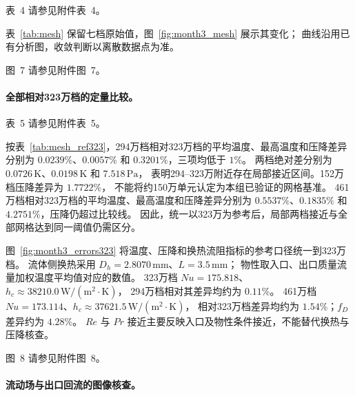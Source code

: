 \documentclass[stage2,fontset=fandol]{ydzjreport}
\makeatletter
\newcommand{\submissionnumber}[1]{\def\@currentlabel{#1}}
\makeatother
\begin{document}
\par\noindent \begingroup\submissionnumber{4}\label{tab:mesh}\endgroup 表~4 请参见附件表~4。\par


表~\ref{tab:mesh} 保留七档原始值，图~\ref{fig:month3_mesh} 展示其变化；
曲线沿用已有分析图，收敛判断以离散数据点为准。

\par\noindent \begingroup\submissionnumber{7}\label{fig:month3_mesh}\endgroup 图~7 请参见附件图~7。\par


\paragraph{全部相对323万档的定量比较。}


\par\noindent \begingroup\submissionnumber{5}\label{tab:mesh_ref323}\endgroup 表~5 请参见附件表~5。\par


按表~\ref{tab:mesh_ref323}，294万档相对323万档的平均温度、最高温度和压降差异分别为
$0.0239\%$、$0.0057\%$ 和 $0.3201\%$，三项均低于 $1\%$。
两档绝对差分别为 $0.0726\,\mathrm{K}$、$0.0198\,\mathrm{K}$ 和 $7.518\,\mathrm{Pa}$，
表明294--323万附近存在局部接近区间。152万档压降差异为 $1.7722\%$，
不能将约150万单元认定为本组已验证的网格基准。
461万档相对323万档的平均温度、最高温度和压降差异分别为
$0.5537\%$、$0.1835\%$ 和 $4.2751\%$，压降仍超过比较线。
因此，统一以323万为参考后，局部两档接近与全部网格达到同一阈值仍需区分。

图~\ref{fig:month3_errors323} 将温度、压降和换热流阻指标的参考口径统一到323万档。
流体侧换热采用 $D_h=2.8070\,\mathrm{mm}$、$L=3.5\,\mathrm{mm}$；
物性取入口、出口质量流量加权温度平均值对应的数值。
323万档 $Nu=175.818$、$h_c\approx38210.0\,\mathrm{W/(m^2\cdot K)}$，
294万档相对其差异均约为 $0.11\%$。
461万档 $Nu=173.114$、$h_c\approx37621.5\,\mathrm{W/(m^2\cdot K)}$，
相对323万档差异均约为 $1.54\%$；$f_D$ 差异约为 $4.28\%$。
$Re$ 与 $Pr$ 接近主要反映入口及物性条件接近，不能替代换热与压降核查。


\par\noindent \begingroup\submissionnumber{8}\label{fig:month3_errors323}\endgroup 图~8 请参见附件图~8。\par


\paragraph{流动场与出口回流的图像核查。}
\end{document}
